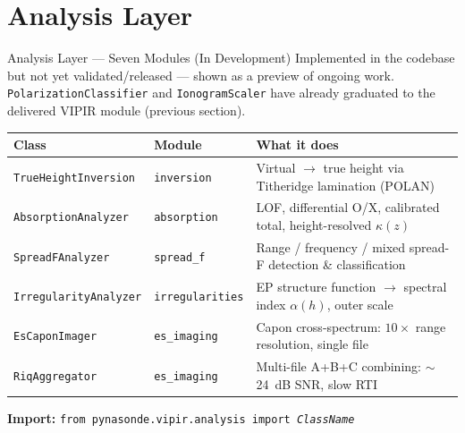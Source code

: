 \documentclass[aspectratio=169,11pt]{beamer}
\begin{document}
\section{Analysis Layer}

\begin{frame}{Analysis Layer — Seven Modules \textcolor{orange!80!black}{(In Development)}}
{\scriptsize\color{orange!80!black} Implemented in the codebase but not yet
validated/released — shown as a preview of ongoing work.
\texttt{PolarizationClassifier} and \texttt{IonogramScaler} have already
graduated to the delivered VIPIR module (previous section).}
\vspace{0.1cm}
\begin{center}
\scriptsize
\begin{tabular}{ll>{\raggedright\arraybackslash}p{6.0cm}}
  \toprule
  \textbf{Class} & \textbf{Module} & \textbf{What it does} \\
  \midrule
  \texttt{TrueHeightInversion}    & \texttt{inversion}       & Virtual $\to$ true height via Titheridge lamination (POLAN) \\
  \texttt{AbsorptionAnalyzer}     & \texttt{absorption}      & LOF, differential O/X, calibrated total, height-resolved $\kappa(z)$ \\
  \texttt{SpreadFAnalyzer}        & \texttt{spread\_f}       & Range / frequency / mixed spread-F detection \& classification \\
  \texttt{IrregularityAnalyzer}   & \texttt{irregularities}  & EP structure function $\to$ spectral index $\alpha(h)$, outer scale \\
  \texttt{EsCaponImager}          & \texttt{es\_imaging}     & Capon cross-spectrum: $10\times$ range resolution, single file \\
  \texttt{RiqAggregator}          & \texttt{es\_imaging}     & Multi-file A+B+C combining: $\sim$24~dB SNR, slow RTI \\
  \bottomrule
\end{tabular}
\end{center}
\vspace{0.15cm}
\begin{center}
  \small\textbf{Import:}\;
  \texttt{from pynasonde.vipir.analysis import \textit{ClassName}}
\end{center}
\end{frame}
\end{document}
